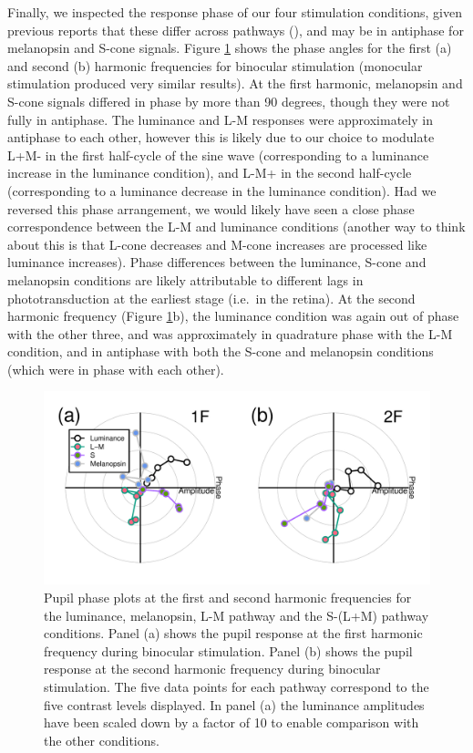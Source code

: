 \documentclass[
]{article}
\begin{document}
Finally, we inspected the response phase of our four stimulation conditions, given previous reports that these differ across pathways (), and may be in antiphase for melanopsin and S-cone signals. Figure \ref{fig:phaseplots} shows the phase angles for the first (a) and second (b) harmonic frequencies for binocular stimulation (monocular stimulation produced very similar results). At the first harmonic, melanopsin and S-cone signals differed in phase by more than 90 degrees, though they were not fully in antiphase. The luminance and L-M responses were approximately in antiphase to each other, however this is likely due to our choice to modulate L+M- in the first half-cycle of the sine wave (corresponding to a luminance increase in the luminance condition), and L-M+ in the second half-cycle (corresponding to a luminance decrease in the luminance condition). Had we reversed this phase arrangement, we would likely have seen a close phase correspondence between the L-M and luminance conditions (another way to think about this is that L-cone decreases and M-cone increases are processed like luminance increases). Phase differences between the luminance, S-cone and melanopsin conditions are likely attributable to different lags in phototransduction at the earliest stage (i.e.~in the retina). At the second harmonic frequency (Figure \ref{fig:phaseplots}b), the luminance condition was again out of phase with the other three, and was approximately in quadrature phase with the L-M condition, and in antiphase with both the S-cone and melanopsin conditions (which were in phase with each other).

\begin{figure}

{\centering \includegraphics{Figures/phaseplots} 

}

\caption{Pupil phase plots at the first and second harmonic frequencies for the luminance, melanopsin, L-M pathway and the S-(L+M) pathway conditions. Panel (a) shows the pupil response at the first harmonic frequency during binocular stimulation. Panel (b) shows the pupil response at the second harmonic frequency during binocular stimulation. The five data points for each pathway correspond to the five contrast levels displayed. In panel (a) the luminance amplitudes have been scaled down by a factor of 10 to enable comparison with the other conditions.}\label{fig:phaseplots}
\end{figure}
\end{document}
